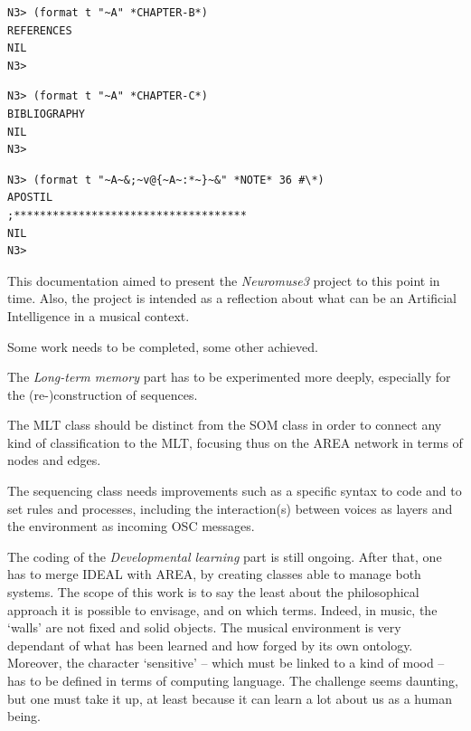 \documentclass{article}
\begin{document}
\begin{lstlisting}[language=sectitle]
N3> (format t "~A" *CHAPTER-B*)
REFERENCES
NIL
N3> 
\end{lstlisting}

\bigskip
\bigskip

\begin{lstlisting}[language=sectitle]
N3> (format t "~A" *CHAPTER-C*)
BIBLIOGRAPHY
NIL
N3> 
\end{lstlisting}


\bigskip
\bigskip

\begin{lstlisting}[language=sectitle]
N3> (format t "~A~&;~v@{~A~:*~}~&" *NOTE* 36 #\*)
APOSTIL
;************************************
NIL
N3> 
\end{lstlisting}

\bigskip

This documentation aimed to present the \textsl{Neuromuse3} project to this point in time. Also, the project is intended as a reflection about what can be an Artificial Intelligence in a musical context. 

Some work needs to be completed, some other achieved.

\bigskip

The \textsl{Long-term memory} part has to be experimented more deeply, especially for the (re-)construction of sequences. 

The MLT class should be distinct from the SOM class in order to connect any kind of classification to the MLT, focusing thus on the AREA network in terms of nodes and edges.

The sequencing class needs improvements such as a specific syntax to code and to set rules and processes, including the interaction(s) between voices as layers and the environment as incoming OSC messages.
\bigskip

The coding of the \textsl{Developmental learning} part is still ongoing. 
After that, one has to merge IDEAL with AREA, by creating classes able to manage both systems. The scope of this work is to say the least about the philosophical approach it is possible to envisage, and on which terms. Indeed, in music, the `walls' are not  fixed and solid objects. The musical environment is very dependant of what has been learned and how forged by its own ontology. Moreover, the character `sensitive' -- which must be linked to a kind of mood -- has to be defined in terms of computing language. The challenge seems daunting, but one must take it up, at least because it can learn a lot about us as a human being.
\end{document}
